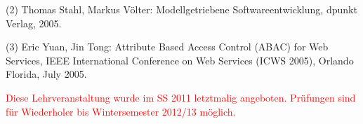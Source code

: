 \begin{course}
\begin{literature}
 

(2) Thomas Stahl, Markus Völter: Modellgetriebene Softwareentwicklung, dpunkt Verlag, 2005.

 

(3) Eric Yuan, Jin Tong: Attribute Based Access Control (ABAC) for Web Services, IEEE International Conference on Web Services (ICWS 2005), Orlando Florida, July 2005.

\end{literature}

\begin{remarks}\textcolor{red}{Diese Lehrveranstaltung wurde im SS 2011 letztmalig angeboten. Prüfungen sind für Wiederholer bis Wintersemester 2012/13 möglich.}

\end{remarks}

\end{course}